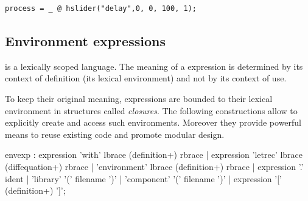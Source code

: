 \begin{lstlisting}
process = _ @ hslider("delay",0, 0, 100, 1);
\end{lstlisting}

\subsection{Environment expressions}
\faust is a lexically scoped language. The meaning of a \faust expression is determined by its context of definition (its lexical environment) and not by its context of use. 

To keep their original meaning, \faust expressions are bounded to their lexical environment in structures called \textit{closures}. The following constructions allow to explicitly create and access such environments. Moreover they provide powerful means to reuse existing code and promote modular design.


\begin{rail}
envexp :    expression 'with' lbrace (definition+) rbrace
          | expression 'letrec' lbrace (diffequation+) rbrace
          | 'environment' lbrace (definition+) rbrace
		  | expression '.' ident
          | 'library' '(' filename ')'
          | 'component' '(' filename ')'
          | expression '[' (definition+) ']';         
\end{rail}

